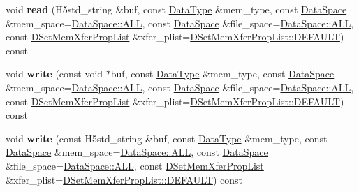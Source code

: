 \begin{DoxyCompactItemize}
void {\bfseries read} (H5std\+\_\+string \&buf, const \hyperlink{class_h5_1_1_data_type}{Data\+Type} \&mem\+\_\+type, const \hyperlink{class_h5_1_1_data_space}{Data\+Space} \&mem\+\_\+space=\hyperlink{class_h5_1_1_data_space_ae8a22405edd631eb923a327d39462ff2}{Data\+Space\+::\+A\+LL}, const \hyperlink{class_h5_1_1_data_space}{Data\+Space} \&file\+\_\+space=\hyperlink{class_h5_1_1_data_space_ae8a22405edd631eb923a327d39462ff2}{Data\+Space\+::\+A\+LL}, const \hyperlink{class_h5_1_1_d_set_mem_xfer_prop_list}{D\+Set\+Mem\+Xfer\+Prop\+List} \&xfer\+\_\+plist=\hyperlink{class_h5_1_1_d_set_mem_xfer_prop_list_ae69bf0ec7bccd4bb793ffe1ff770d8c4}{D\+Set\+Mem\+Xfer\+Prop\+List\+::\+D\+E\+F\+A\+U\+LT}) const
\item 
\mbox{\label{class_h5_1_1_data_set_a0466e3d7c4828c6ff464e3ba93773262}} 
void {\bfseries write} (const void $\ast$buf, const \hyperlink{class_h5_1_1_data_type}{Data\+Type} \&mem\+\_\+type, const \hyperlink{class_h5_1_1_data_space}{Data\+Space} \&mem\+\_\+space=\hyperlink{class_h5_1_1_data_space_ae8a22405edd631eb923a327d39462ff2}{Data\+Space\+::\+A\+LL}, const \hyperlink{class_h5_1_1_data_space}{Data\+Space} \&file\+\_\+space=\hyperlink{class_h5_1_1_data_space_ae8a22405edd631eb923a327d39462ff2}{Data\+Space\+::\+A\+LL}, const \hyperlink{class_h5_1_1_d_set_mem_xfer_prop_list}{D\+Set\+Mem\+Xfer\+Prop\+List} \&xfer\+\_\+plist=\hyperlink{class_h5_1_1_d_set_mem_xfer_prop_list_ae69bf0ec7bccd4bb793ffe1ff770d8c4}{D\+Set\+Mem\+Xfer\+Prop\+List\+::\+D\+E\+F\+A\+U\+LT}) const
\item 
\mbox{\label{class_h5_1_1_data_set_aa324b3d2eb4db1c29a5533eee8787e7e}} 
void {\bfseries write} (const H5std\+\_\+string \&buf, const \hyperlink{class_h5_1_1_data_type}{Data\+Type} \&mem\+\_\+type, const \hyperlink{class_h5_1_1_data_space}{Data\+Space} \&mem\+\_\+space=\hyperlink{class_h5_1_1_data_space_ae8a22405edd631eb923a327d39462ff2}{Data\+Space\+::\+A\+LL}, const \hyperlink{class_h5_1_1_data_space}{Data\+Space} \&file\+\_\+space=\hyperlink{class_h5_1_1_data_space_ae8a22405edd631eb923a327d39462ff2}{Data\+Space\+::\+A\+LL}, const \hyperlink{class_h5_1_1_d_set_mem_xfer_prop_list}{D\+Set\+Mem\+Xfer\+Prop\+List} \&xfer\+\_\+plist=\hyperlink{class_h5_1_1_d_set_mem_xfer_prop_list_ae69bf0ec7bccd4bb793ffe1ff770d8c4}{D\+Set\+Mem\+Xfer\+Prop\+List\+::\+D\+E\+F\+A\+U\+LT}) const
\item 
\mbox{\label{class_h5_1_1_data_set_a23b1e511f401e1dca147d224a6240d96}} 

\end{DoxyCompactItemize}

